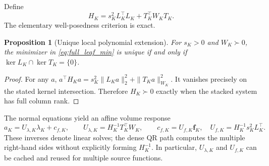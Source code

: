 \documentclass[11pt]{article}
\newtheorem{proposition}{Proposition}
\begin{document}
Define
\begin{equation}\label{eq:full_H}
 H_K=s_K^2L_K^\top L_K+T_K^\top W_KT_K.
\end{equation}
The elementary well-posedness criterion is exact.
\begin{proposition}[Unique local polynomial extension]
\label{prop:full_leaf_unique}
For $s_K>0$ and $W_K\succ0$, the minimizer in
\eqref{eq:full_leaf_min} is unique if and only if
$\ker L_K\cap\ker T_K=\{0\}$.
\end{proposition}
\begin{proof}
For any $a$, $a^\top H_Ka=s_K^2\|L_Ka\|_2^2+\|T_Ka\|_{W_K}^2$.
It vanishes precisely on the stated kernel intersection.  Therefore
$H_K\succ0$ exactly when the stacked system has full column rank.
\end{proof}
The normal equations yield an affine volume response
\begin{equation}\label{eq:full_Ulambda_cf}
 \boxed{\displaystyle
 a_K=U_{\lambda,K}\lambda_K+c_{f,K},\qquad
 U_{\lambda,K}=H_K^{-1}T_K^\top W_K,\qquad
 c_{f,K}=U_{f,K}\bm f_K,\quad
 U_{f,K}=H_K^{-1}s_K^2L_K^\top.}
\end{equation}
These inverses denote linear solves; the dense QR path computes the
multiple right-hand sides without explicitly forming $H_K^{-1}$.
In particular, $U_{\lambda,K}$ and $U_{f,K}$ can be cached and reused
for multiple source functions.
\end{document}
